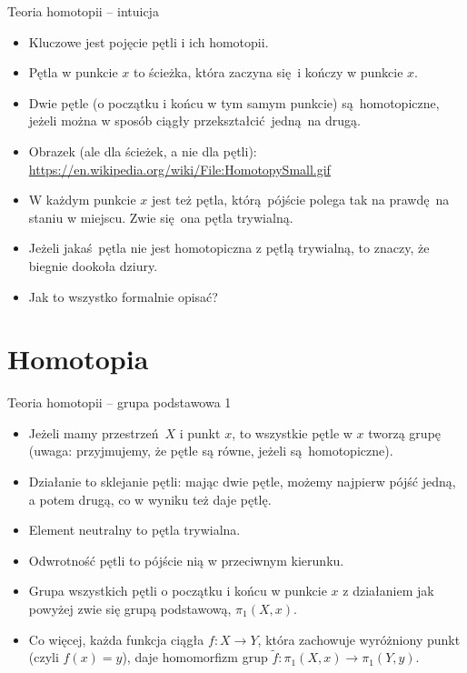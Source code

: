 \documentclass{beamer}
\begin{document}
\begin{frame}{Teoria homotopii -- intuicja}
\begin{itemize}
	\item Kluczowe jest pojęcie pętli i ich homotopii.
	\item Pętla w punkcie $x$ to ścieżka, która zaczyna się i kończy w punkcie $x$.
	\item Dwie pętle (o początku i końcu w tym samym punkcie) są homotopiczne, jeżeli można w sposób ciągły przekształcić jedną na drugą.
	\item Obrazek (ale dla ścieżek, a nie dla pętli): \url{https://en.wikipedia.org/wiki/File:HomotopySmall.gif}
	\item W każdym punkcie $x$ jest też pętla, którą pójście polega tak na prawdę na staniu w miejscu. Zwie się ona pętla trywialną.
	\item Jeżeli jakaś pętla nie jest homotopiczna z pętlą trywialną, to znaczy, że biegnie dookoła dziury.
	\item Jak to wszystko formalnie opisać?
\end{itemize}
\end{frame}

\section{Homotopia}

\begin{frame}{Teoria homotopii -- grupa podstawowa 1}
\begin{itemize}
	\item Jeżeli mamy przestrzeń $X$ i punkt $x$, to wszystkie pętle w $x$ tworzą grupę (uwaga: przyjmujemy, że pętle są równe, jeżeli są homotopiczne).
	\item Działanie to sklejanie pętli: mając dwie pętle, możemy najpierw pójść jedną, a potem drugą, co w wyniku też daje pętlę.
	\item Element neutralny to pętla trywialna.
	\item Odwrotność pętli to pójście nią w przeciwnym kierunku.
	\item Grupa wszystkich pętli o początku i końcu w punkcie $x$ z działaniem jak powyżej zwie się grupą podstawową, $\pi_1(X, x)$.
	\item Co więcej, każda funkcja ciągła $f: X \to Y$, która zachowuje wyróżniony punkt (czyli $f(x) = y$), daje homomorfizm grup $\tilde{f}: \pi_1(X, x) \to \pi_1(Y, y)$.
\end{itemize}
\end{frame}
\end{document}
